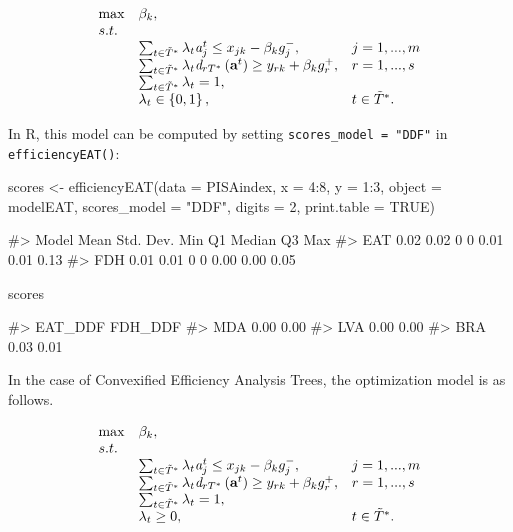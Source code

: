 \begin{equation} \label{(29)} 
\begin{array}{lllll} 
{} & {\max } & {\beta_{k}, } & {} & {} \\ 
{} & {s.t.} & {} & {} & {} \\ 
{} & {} & {\sum_{t\in \tilde{T}^{*}}^{}\lambda_{t}{\it a}_{j}^{t}  \le x_{jk} -\beta_{k} g_{j}^{-} ,} & {j=1,...,m} & {} \\ 
{} & {} & {\sum_{t\in \tilde{T}^{*}}^{}\lambda_{t}{\it d}_{rT^{*}} \left({\it \textbf{a}}^{t} \right) \ge y_{rk} +\beta_{k} g_{r}^{+} ,} & {r=1,...,s} & {} \\ 
{} & {} & {\sum_{t\in \tilde{T}^{*}}^{}\lambda_{t}=1,} & {} & {} \\ 
{} & {} & {\lambda _{t} \in \left\{0,1\right\},} & {t\in \tilde{T}^{*}. } & {} 
\end{array} 
\end{equation}

In R, this model can be computed by setting
\texttt{scores\_model\ =\ "DDF"} in \texttt{efficiencyEAT()}:

\begin{Schunk}
\begin{Sinput}
scores <- efficiencyEAT(data = PISAindex, x = 4:8, y = 1:3, object = modelEAT, 
                        scores_model = "DDF", digits = 2, 
                        print.table = TRUE)
\end{Sinput}
\begin{Soutput}
#>  Model Mean Std. Dev. Min Q1 Median   Q3  Max
#>    EAT 0.02      0.02   0  0   0.01 0.01 0.13
#>    FDH 0.01      0.01   0  0   0.00 0.00 0.05
\end{Soutput}
\begin{Sinput}
scores %>% sample_n(3)
\end{Sinput}
\begin{Soutput}
#>     EAT_DDF FDH_DDF
#> MDA    0.00    0.00
#> LVA    0.00    0.00
#> BRA    0.03    0.01
\end{Soutput}
\end{Schunk}

In the case of Convexified Efficiency Analysis Trees, the optimization
model is as follows.

\begin{equation} \label{(30)} 
\begin{array}{lllll} 
{} & {\max } & {\beta _{k}, } & {} & {} \\ 
{} & {s.t.} & {} & {} & {} \\ 
{} & {} & {\sum_{t\in \tilde{T}^{*} }^{}\lambda_{t} {\it a}_{j}^{t} \le x_{jk} -\beta_{k} g_{j}^{-} ,} & {j=1,...,m} & {} \\ 
{} & {} & {\sum_{t\in \tilde{T}^{*} }^{}\lambda_{t} {\it d}_{rT^{*}} \left({\it \textbf{a}}^{t} \right) \ge y_{rk} +\beta_{k} g_{r}^{+} ,} & {r=1,...,s} & {} \\ 
{} & {} & {\sum_{t\in \tilde{T}^{*} }^{}\lambda_{t}=1,} & {} & {} \\ 
{} & {} & {\lambda _{t} \ge 0,} & {t\in \tilde{T}^{*}. } & {} 
\end{array} 
\end{equation}

